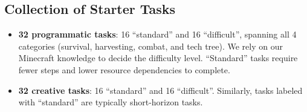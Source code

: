 \subsection{Collection of Starter Tasks}


\begin{itemize}[leftmargin=2em,labelsep=0.7em]
    \item \textbf{32 programmatic tasks}: 16 ``standard'' and 16 ``difficult'', spanning all 4 categories (survival, harvesting, combat, and tech tree). We rely on our Minecraft knowledge to decide the difficulty level. ``Standard'' tasks require fewer steps and lower resource dependencies to complete. 
    \item \textbf{32 creative tasks}: 16 ``standard'' and 16 ``difficult''. Similarly, tasks labeled with ``standard'' are typically short-horizon tasks. 
\end{itemize}


